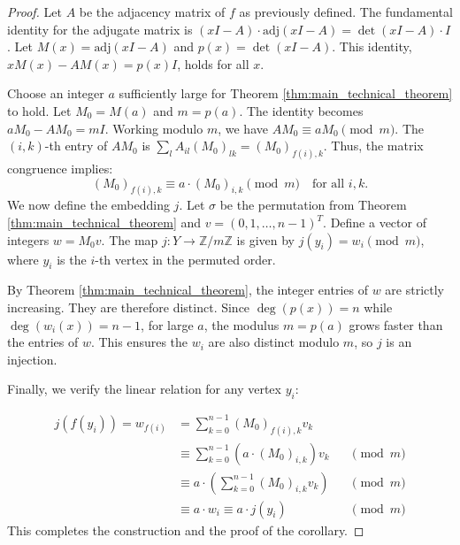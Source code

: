 \begin{proof}
Let $A$ be the adjacency matrix of $f$ as previously defined. The fundamental identity for the adjugate matrix is $(xI - A) \cdot \text{adj}(xI - A) = \det(xI - A) \cdot I$. Let $M(x) = \text{adj}(xI - A)$ and $p(x) = \det(xI - A)$. This identity, $xM(x) - AM(x) = p(x)I$, holds for all $x$.

Choose an integer $a$ sufficiently large for Theorem \ref{thm:main_technical_theorem} to hold. Let $M_0 = M(a)$ and $m = p(a)$. The identity becomes $aM_0 - AM_0 = mI$. Working modulo $m$, we have $AM_0 \equiv aM_0 \pmod{m}$. The $(i, k)$-th entry of $AM_0$ is $\sum_{l} A_{il} (M_0)_{lk} = (M_0)_{f(i), k}$. Thus, the matrix congruence implies:
\[
(M_0)_{f(i), k} \equiv a \cdot (M_0)_{i, k} \pmod{m} \quad \text{for all } i, k.
\]
We now define the embedding $j$. Let $\sigma$ be the permutation from Theorem \ref{thm:main_technical_theorem} and $v=(0, 1, \dots, n-1)^T$. Define a vector of integers $w = M_0 v$. The map $j: Y \to \mathbb{Z}/m\mathbb{Z}$ is given by $j(y_i) = w_i \pmod m$, where $y_i$ is the $i$-th vertex in the permuted order.

By Theorem \ref{thm:main_technical_theorem}, the integer entries of $w$ are strictly increasing. They are therefore distinct. Since $\deg(p(x))=n$ while $\deg(w_i(x)) = n-1$, for large $a$, the modulus $m=p(a)$ grows faster than the entries of $w$. This ensures the $w_i$ are also distinct modulo $m$, so $j$ is an injection.

Finally, we verify the linear relation for any vertex $y_i$:

\begin{align*}
j(f(y_i)) = w_{f(i)} &= \sum_{k=0}^{n-1} (M_0)_{f(i), k} v_k \\
&\equiv \sum_{k=0}^{n-1} \left(a \cdot (M_0)_{i, k}\right) v_k &&\pmod{m} \\
&\equiv a \cdot \left(\sum_{k=0}^{n-1} (M_0)_{i, k} v_k\right) &&\pmod{m} \\
&\equiv a \cdot w_i \equiv a \cdot j(y_i) &&\pmod{m}
\end{align*}
This completes the construction and the proof of the corollary.

\end{proof}
